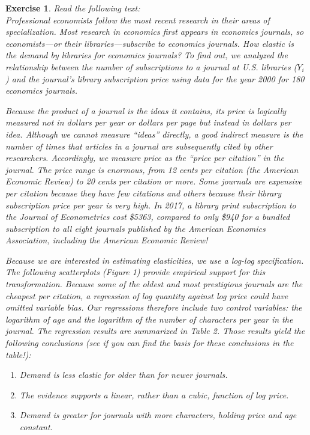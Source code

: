 \documentclass{article}
\newtheorem{exercise}[theorem]{Exercise}
\begin{document}
\begin{exercise}
Read the following text:\\[1em]

Professional economists follow the most recent research in their areas of specialization. Most research in economics first appears in economics journals, so economists—or their libraries—subscribe to economics journals. How elastic is the demand by libraries for economics journals? To find out, we analyzed the relationship between the number of subscriptions to a journal at U.S. libraries ($Y_i$) and the journal’s library subscription price using data for the year 2000 for 180 economics journals.

Because the product of a journal is the ideas it contains, its price is logically measured not in dollars per year or dollars per page but instead in dollars per idea. Although we cannot measure “ideas” directly, a good indirect measure is the number of times that articles in a journal are subsequently cited by other researchers. Accordingly, we measure price as the ``price per citation'' in the journal. The price range is enormous, from 12 cents per citation (the American Economic Review) to 20 cents per citation or more. Some journals are expensive per citation because they have few citations and others because their library subscription price per year is very high. In 2017, a library print subscription to the Journal of Econometrics cost \$5363, compared to only \$940 for a bundled subscription to all eight journals published by the American Economics Association, including the American Economic Review!

Because we are interested in estimating elasticities, we use a log-log specification. The following scatterplots (Figure 1) provide empirical support for this transformation. Because some of the oldest and most prestigious journals are the cheapest per citation, a regression of log quantity against log price could have omitted variable bias. Our regressions therefore include two control variables: the logarithm of age and the logarithm of the number of characters per year in the journal. The regression results are summarized in Table 2. Those results yield the following conclusions (see if you can find the basis for these conclusions in the table!):
\begin{enumerate}
    \item Demand is less elastic for older than for newer
journals.
    \item The evidence supports a linear, rather than a cubic, function of log price.
    \item Demand is greater for journals with more characters, holding price and age constant.\\[1em]
\end{enumerate}


\end{exercise}
\end{document}
